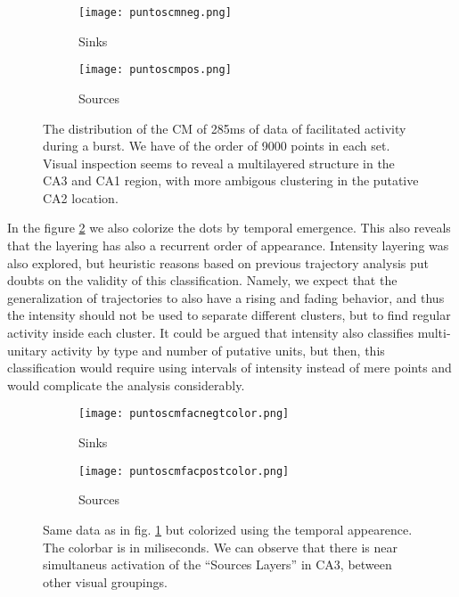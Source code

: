 \documentclass{article}
\begin{document}
\begin{figure}
\centering
\begin{subfigure}{0.40\textwidth}
\texttt{[image: puntoscmneg.png]}
\caption{Sinks}
\end{subfigure}
\begin{subfigure}{0.40\textwidth}
\texttt{[image: puntoscmpos.png]}
\caption{Sources}
\end{subfigure}

\caption{The distribution of the CM of 285ms of data of facilitated activity
during a burst. We have of the order of 9000 points in each
set. Visual inspection seems to reveal a multilayered structure in the
CA3 and CA1 region, with more ambigous clustering in the putative
CA2 location.}\label{puntostodos}

\end{figure}

In the figure \ref{puntosconcolor} we also colorize the dots by temporal emergence.
This also reveals that the layering has also a recurrent order of appearance. Intensity
layering was also explored, but heuristic reasons based on previous trajectory
analysis put doubts on the validity of this classification. Namely, we expect
that the generalization of trajectories to also have a rising and fading behavior,
and thus the intensity should not be used to separate different clusters, but to
find regular activity inside each cluster. It could be argued that intensity also
classifies multi-unitary activity by type and number of putative units, but then,
this classification would require using intervals of intensity instead of mere
points and would complicate the analysis considerably.


\begin{figure}
\centering
\begin{subfigure}{0.40\textwidth}
\texttt{[image: puntoscmfacnegtcolor.png]}
\caption{Sinks}
\end{subfigure}
\begin{subfigure}{0.40\textwidth}
\texttt{[image: puntoscmfacpostcolor.png]}
\caption{Sources}
\end{subfigure}

\caption{Same data as in fig. \ref{puntostodos} but colorized using
the temporal appearence. The colorbar is in miliseconds. We can observe
that there is near simultaneus activation of the ``Sources Layers'' in CA3,
between other visual groupings. 
}\label{puntosconcolor}

\end{figure}
\end{document}

